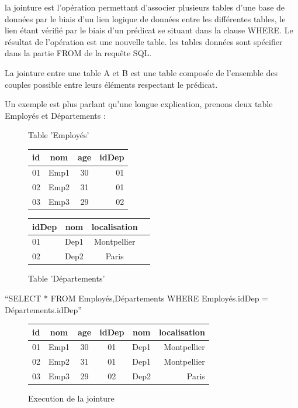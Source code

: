 \documentclass[oneside,13pt,a4paper]{report}
\begin{document}
la jointure est l'opération permettant d’associer plusieurs tables d'une base de données par le biais d’un lien logique de données entre les différentes tables, 
le lien étant vérifié par le biais d'un prédicat se situant dans la clause WHERE. Le résultat de l'opération est une nouvelle table. 
les tables données sont spécifier dans la partie FROM de la requête SQL.

La jointure entre une table A et B est une table composée de l'ensemble des couples possible entre leurs éléments respectant le prédicat.

Un exemple est plus parlant qu'une longue explication, prenons deux table Employés et Départements : 

\begin{figure}[h]
	\begin{minipage}[c]{.46\linewidth}
		\centering
		\caption{Table 'Employés'}
		\begin{tabular}{|l|c|c|r|}
			\hline
			id   & nom  & age & idDep 
			\\
			\hline
			01 & Emp1 &  30  & 01 \\
			02 & Emp2 &  31  & 01 \\
			03 & Emp3 &  29  & 02 \\
			\hline
		\end{tabular}
	\end{minipage}
	\hfill%
	\begin{minipage}[c]{.46\linewidth}
		\centering
		\caption{Table 'Départements'}
		\begin{tabular}{|l|c|c|r|}
			\hline
			idDep   & nom   & localisation
			\\
			\hline
			01 & Dep1 &  Montpellier  \\
			02 & Dep2 &  Paris  \\
			\hline
		\end{tabular}
	\end{minipage}
\end{figure}

	\enquote{SELECT * FROM Employés,Départements WHERE Employés.idDep = Départements.idDep}

\begin{figure}[h]
		\centering
		\caption{Execution de la jointure}
		\begin{tabular}{|l|c|c|c|c|r|}
			\hline
			id   & nom  & age & idDep & nom   & localisation 
			\\
			\hline
			01 & Emp1 &  30  & 01 & Dep1 &  Montpellier \\
			02 & Emp2 &  31  & 01 & Dep1 &  Montpellier \\
			03 & Emp3 &  29  & 02 & Dep2 &  Paris \\
			\hline
		\end{tabular}
\end{figure}
\end{document}

